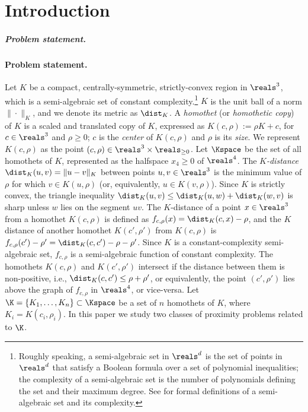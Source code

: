 \section{Introduction}
\label{sec:intro}
%
\ifsocgproc 
\subparagraph*{Problem statement.}
\else
\paragraph{Problem statement.}
\fi
Let $K$ be a compact, centrally-symmetric, strictly-convex region in $\reals^3$, which 
is a semi-algebraic set of constant complexity.\footnote{%
  Roughly speaking, a semi-algebraic set in $\reals^d$ is the set of points in $\reals^d$ that 
  satisfy a Boolean formula over a set of polynomial inequalities; the complexity of a semi-algebraic 
  set is the number of polynomials defining the set and their maximum degree.
  See \cite{BPR} for formal definitions of a semi-algebraic set and its complexity.}
$K$ is the unit ball of a norm
$\|\cdot\|_K$, and we denote its metric as $\dist_K$. 
%
A \emph{homothet} (or \emph{homothetic copy}) of $K$ is a scaled and translated copy of $K$, expressed as
$K(c,\rho) := \rho K + c$, for $c\in\reals^3$ and $\rho \ge 0$; $c$ is the \emph{center}
of $K(c,\rho)$ and $\rho$ is its \emph{size}. We represent $K(c,\rho)$ as the point 
$(c,\rho)\in\reals^3\times\reals_{\ge 0}$. Let $\Kspace$ be the set of all homothets of 
$K$, represented as the halfspace $x_4\ge 0$ of $\reals^4$.  
The \emph{$K$-distance} $\dist_K(u,v) = \|u-v\|_K$ between points $u,v\in\reals^3$
is the minimum value of $\rho$ for which 
$v\in K(u,\rho)$ (or, equivalently, $u\in K(v,\rho)$). Since $K$ is strictly convex, the 
triangle inequality $\dist_K(u,v) \le \dist_K(u,w) + \dist_K(w,v)$ is sharp unless $w$ lies 
on the segment $uv$.
The $K$-distance of a point $x\in\reals^3$ from a homothet $K(c,\rho)$ is defined as 
$f_{c,\rho}(x) = \dist_K(c,x)-\rho$, 
and the $K$ distance of another homothet $K(c',\rho')$ from $K(c,\rho)$ is $f_{c,\rho}(c')-\rho' = \dist_K(c,c')-\rho-\rho'$. 
Since $K$ is a constant-complexity semi-algebraic set, $f_{c,\rho}$ is 
a semi-algebraic function of constant complexity. 
The homothets $K(c,\rho)$ and $K(c',\rho')$ intersect if the distance between them is non-positive, 
i.e., $\dist_K(c,c') \le \rho+\rho'$, or equivalently, the point $(c',\rho')$ lies 
above the graph of $f_{c,\rho}$ in $\reals^4$, or vice-versa.
%
Let $\K=\{K_1, \ldots, K_n\} \subset \Kspace$ be a set of $n$ homothets of $K$, where 
$K_i=K(c_i,\rho_i)$. In this paper we study two classes of proximity problems related to $\K$.
